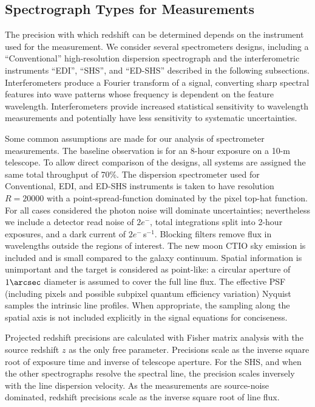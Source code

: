 \documentclass[preprint2, 10pt]{aastex}
\begin{document}
\subsection{Spectrograph Types for Measurements} 

The precision with which redshift can be determined depends on the instrument used for the measurement.
We consider several spectrometers designs, including a ``Conventional'' high-resolution dispersion spectrograph and the
interferometric instruments ``EDI'',
``SHS'', and ``ED-SHS'' described in the following subsections.  Interferometers produce a Fourier transform of a signal, converting sharp
spectral features into wave patterns whose frequency is dependent on the feature wavelength.  Interferometers provide
increased statistical sensitivity to wavelength measurements and potentially have less sensitivity to systematic
uncertainties.

Some common assumptions are made for our analysis of spectrometer 
measurements. 
The baseline observation is for an 8-hour exposure on a 10-m telescope.
To allow direct comparison of the 
designs, all systems are assigned the same total throughput of 70\%.
The dispersion spectrometer used for Conventional, EDI, and ED-SHS instruments is taken to have resolution $R=20000$ with a 
point-spread-function dominated by the pixel top-hat function.
For all cases considered the photon noise will dominate uncertainties; nevertheless
we include a detector read noise of $2e^-$, total integrations split into 2-hour exposures, and a dark current of $2e^-$\,s$^{-1}$. 
Blocking filters remove flux in wavelengths outside the regions
of interest.  The new moon CTIO sky emission is included and
is small compared to the galaxy continuum.
Spatial information is unimportant and the target is considered as point-like: a
circular aperture of $1\arcsec$ diameter is assumed to cover the full line flux.
The effective PSF (including pixels and possible subpixel quantum efficiency variation) 
Nyquist samples the intrinsic line profiles.
When appropriate, the sampling along the spatial axis is not included explicitly in the
signal equations for conciseness.


Projected redshift precisions are calculated with Fisher matrix analysis with the source
redshift $z$ as the only free parameter. 
Precisions scale as the inverse square root of exposure time and inverse of telescope aperture. 
For the SHS, and when the other spectrographs resolve the spectral line, the precision scales 
inversely 
with the line dispersion velocity.  
As the measurements
are source-noise dominated, redshift precisions scale as the inverse square 
root
of line flux. 
\end{document}
